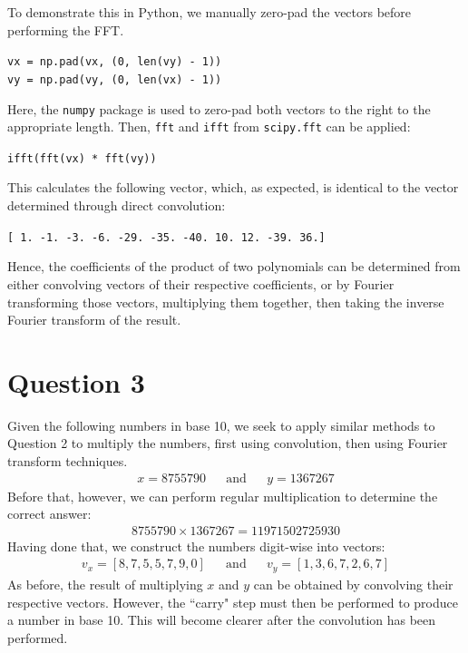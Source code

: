 \documentclass[a4paper, 11pt]{article}
\begin{document}
To demonstrate this in Python, we manually zero-pad the vectors before
performing the FFT.
\begin{center}
    \texttt{vx = np.pad(vx, (0, len(vy) - 1))} \\
    \texttt{vy = np.pad(vy, (0, len(vx) - 1))}
\end{center}
Here, the \texttt{numpy} package is used to zero-pad both vectors to the right
to the appropriate length. Then, \texttt{fft} and \texttt{ifft} from
\texttt{scipy.fft} can be applied:
\begin{center}
    \texttt{ifft(fft(vx) * fft(vy))}
\end{center}
This calculates the following vector, which, as expected, is identical to the
vector determined through direct convolution:
\begin{center}
    \texttt{[  1.  -1.  -3.  -6. -29. -35. -40.  10.  12. -39.  36.]}
\end{center}
Hence, the coefficients of the product of two polynomials can be determined from
either convolving vectors of their respective coefficients, or by Fourier
transforming those vectors, multiplying them together, then taking the inverse
Fourier transform of the result.

\newpage
\section*{Question 3}

Given the following numbers in base 10, we seek to apply similar methods to
Question 2 to multiply the numbers, first using convolution, then using Fourier
transform techniques.
\begin{align*}
    x = 8755790 && \text{and} && y = 1367267
\end{align*}
Before that, however, we can perform regular multiplication to determine the
correct answer:
\begin{align*}
    8755790 \times 1367267 = 11971502725930
\end{align*}
Having done that, we construct the numbers digit-wise into vectors:
\begin{align*}
    v_x = [8, 7, 5, 5, 7, 9, 0] && \text{and} && v_y = [1, 3, 6, 7, 2, 6, 7]
\end{align*}
As before, the result of multiplying $x$ and $y$ can be obtained by convolving
their respective vectors. However, the ``carry" step must then be performed to
produce a number in base 10. This will become clearer after the convolution has
been performed.
\end{document}
